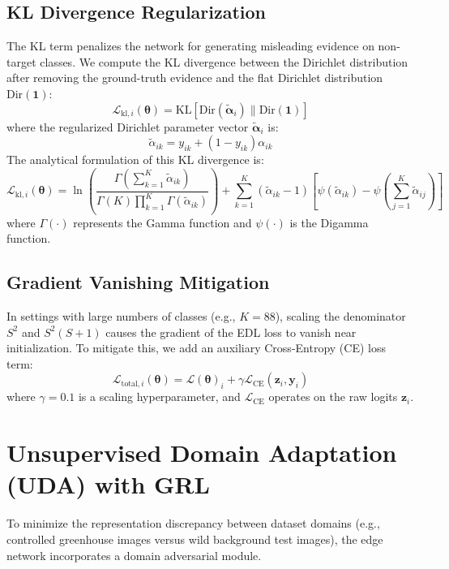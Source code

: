 \documentclass[11pt,journal,onecolumn]{IEEEtran}
\begin{document}
\subsection{KL Divergence Regularization}
The KL term penalizes the network for generating misleading evidence on non-target classes. We compute the KL divergence between the Dirichlet distribution after removing the ground-truth evidence and the flat Dirichlet distribution $\text{Dir}(\mathbf{1})$:
\begin{equation}
    \mathcal{L}_{\text{kl}, i}(\boldsymbol{\theta}) = \text{KL}\left[ \text{Dir}(\tilde{\boldsymbol{\alpha}}_i) \parallel \text{Dir}(\mathbf{1}) \right]
\end{equation}
where the regularized Dirichlet parameter vector $\tilde{\boldsymbol{\alpha}}_i$ is:
\begin{equation}
    \tilde{\alpha}_{ik} = y_{ik} + (1 - y_{ik})\alpha_{ik}
\end{equation}
The analytical formulation of this KL divergence is:
\begin{equation}
    \mathcal{L}_{\text{kl}, i}(\boldsymbol{\theta}) = \ln \left( \frac{\Gamma\left(\sum_{k=1}^K \tilde{\alpha}_{ik}\right)}{\Gamma(K) \prod_{k=1}^K \Gamma(\tilde{\alpha}_{ik})} \right) + \sum_{k=1}^K (\tilde{\alpha}_{ik} - 1) \left[ \psi(\tilde{\alpha}_{ik}) - \psi\left(\sum_{j=1}^K \tilde{\alpha}_{ij}\right) \right]
\end{equation}
where $\Gamma(\cdot)$ represents the Gamma function and $\psi(\cdot)$ is the Digamma function.

\subsection{Gradient Vanishing Mitigation}
In settings with large numbers of classes (e.g., $K = 88$), scaling the denominator $S^2$ and $S^2(S+1)$ causes the gradient of the EDL loss to vanish near initialization. To mitigate this, we add an auxiliary Cross-Entropy (CE) loss term:
\begin{equation}
    \mathcal{L}_{\text{total}, i}(\boldsymbol{\theta}) = \mathcal{L}(\boldsymbol{\theta})_i + \gamma \mathcal{L}_{\text{CE}}( \mathbf{z}_i, \mathbf{y}_i )
\end{equation}
where $\gamma = 0.1$ is a scaling hyperparameter, and $\mathcal{L}_{\text{CE}}$ operates on the raw logits $\mathbf{z}_i$.

\section{Unsupervised Domain Adaptation (UDA) with GRL}
To minimize the representation discrepancy between dataset domains (e.g., controlled greenhouse images versus wild background test images), the edge network incorporates a domain adversarial module.
\end{document}

